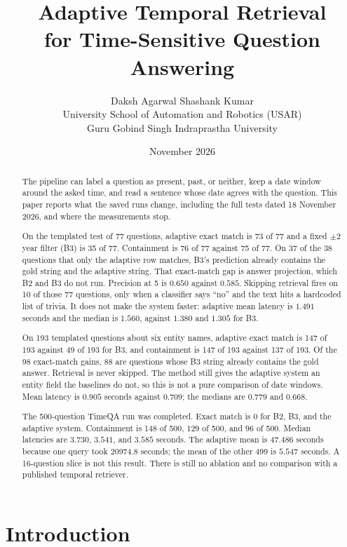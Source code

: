 \documentclass[11pt,letterpaper]{article}
\title{Adaptive Temporal Retrieval\\
for Time-Sensitive Question Answering}
\author{
Daksh Agarwal \quad Shashank Kumar\\
University School of Automation and Robotics (USAR)\\
Guru Gobind Singh Indraprastha University
}
\date{November 2026}
\begin{document}
\maketitle

\begin{abstract}
The pipeline can label a question as present, past, or neither, keep a date window around the asked time, and read a sentence whose date agrees with the question.
This paper reports what the saved runs change, including the full tests dated 18 November 2026, and where the measurements stop.

On the templated test of 77 questions, adaptive exact match is 73 of 77 and a fixed $\pm 2$ year filter (B3) is 35 of 77.
Containment is 76 of 77 against 75 of 77.
On 37 of the 38 questions that only the adaptive row matches, B3's prediction already contains the gold string and the adaptive string.
That exact-match gap is answer projection, which B2 and B3 do not run.
Precision at 5 is $0.650$ against $0.585$.
Skipping retrieval fires on 10 of those 77 questions, only when a classifier says ``no'' and the text hits a hardcoded list of trivia.
It does not make the system faster: adaptive mean latency is $1.491$ seconds and the median is $1.560$, against $1.380$ and $1.305$ for B3.

On 193 templated questions about six entity names, adaptive exact match is 147 of 193 against 49 of 193 for B3, and containment is 147 of 193 against 137 of 193.
Of the 98 exact-match gains, 88 are questions whose B3 string already contains the gold answer.
Retrieval is never skipped.
The method still gives the adaptive system an entity field the baselines do not, so this is not a pure comparison of date windows.
Mean latency is $0.905$ seconds against $0.709$; the medians are $0.779$ and $0.668$.

The 500-question TimeQA run was completed.
Exact match is 0 for B2, B3, and the adaptive system.
Containment is 148 of 500, 129 of 500, and 96 of 500.
Median latencies are $3.730$, $3.541$, and $3.585$ seconds.
The adaptive mean is $47.486$ seconds because one query took $20974.8$ seconds; the mean of the other 499 is $5.547$ seconds.
A 16-question slice is not this result.
There is still no ablation and no comparison with a published temporal retriever.
\end{abstract}

\section{Introduction}
\label{sec:intro}
\end{document}
